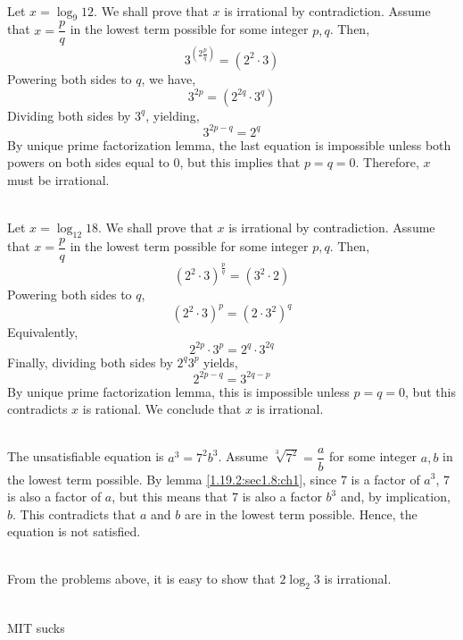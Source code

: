 \begin{pr}\leavevmode
    \\
    Let $x = \log_9 12$. We shall prove that $x$ is irrational by contradiction.
    Assume that $x = \dfrac{p}{q}$ in the lowest term possible for some integer $p,q$. Then,
    \begin{equation*}
        3^{\left(2\frac{p}{q}\right)} = (2^2 \cdot 3)
    \end{equation*}
    Powering both sides to $q$, we have,
    \begin{equation*}
        3^{2p} = (2^{2q} \cdot 3^q)
    \end{equation*}
    Dividing both sides by $3^q$, yielding,
    \begin{equation*}
        3^{2p - q} = 2^q
    \end{equation*}
    By unique prime factorization lemma, the last equation is impossible unless
    both powers on both sides equal to $0$, but this implies that $p = q = 0$. Therefore,
    $x$ must be irrational.
\end{pr}

\begin{pr}\leavevmode
    \\
    Let $x = \log_{12} 18$. We shall prove that $x$ is irrational by contradiction.
    Assume that $x = \dfrac{p}{q}$ in the lowest term possible for some integer $p,q$.
    Then,
    \begin{equation*}
        (2^2 \cdot 3)^{\frac{p}{q}} = (3^2 \cdot 2)
    \end{equation*}
    Powering both sides to $q$,
    \begin{equation*}
        (2^2 \cdot 3)^p = (2 \cdot 3^2)^q
    \end{equation*}
    Equivalently,
    \begin{equation*}
        2^{2p} \cdot 3^p = 2^q \cdot 3^{2q}
    \end{equation*}
    Finally, dividing both sides by $2^q3^p$ yields,
    \begin{equation*}
        2^{2p - q} = 3^{2q - p}
    \end{equation*}
    By unique prime factorization lemma, this is impossible unless $p = q = 0$, but
    this contradicts $x$ is rational. We conclude that $x$ is irrational.
\end{pr}

\begin{pr}\leavevmode
    \\
    The unsatisfiable equation is $a^3 = 7^2b^3$. Assume $\sqrt[3]{7^2} = \dfrac{a}{b}$
    for some integer $a,b$ in the lowest term possible. By lemma \ref{1.19.2:sec1.8:ch1},
    since $7$ is a factor of $a^3$, $7$ is also a factor of $a$, but this means
    that $7$ is also a factor $b^3$ and, by implication, $b$. This contradicts that
    $a$ and $b$ are in the lowest term possible. Hence, the equation is not satisfied.
\end{pr}

\begin{pr}\leavevmode
    \\
    From the problems above, it is easy to show that $2\log_2 3$ is irrational.
\end{pr}

\begin{pr}\leavevmode
    \\
    MIT sucks
\end{pr}